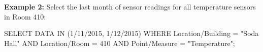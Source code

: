 \textbf{Example 2:}
Select the last month of sensor readings for all temperature sensors in Room 410:

\begin{sqlcode}
SELECT DATA IN (1/11/2015, 1/12/2015) WHERE
Location/Building = "Soda Hall" AND
Location/Room = 410 AND
Point/Measure = "Temperature";
\end{sqlcode}

